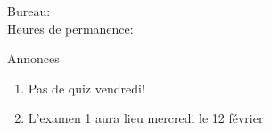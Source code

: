 \documentclass{beamer}
\subtitle[Articles]{Les articles (suite)}
\begin{document}
  \begin{frame}
    \titlepage
    \tiny{Bureau: \\
          Heures de permanence: }
  \end{frame}

  \begin{frame}{Annonces}
    \begin{enumerate}
      \item Pas de quiz vendredi!
      \item L'examen 1 aura lieu mercredi le 12 février
    \end{enumerate}
  \end{frame}

\end{document}
